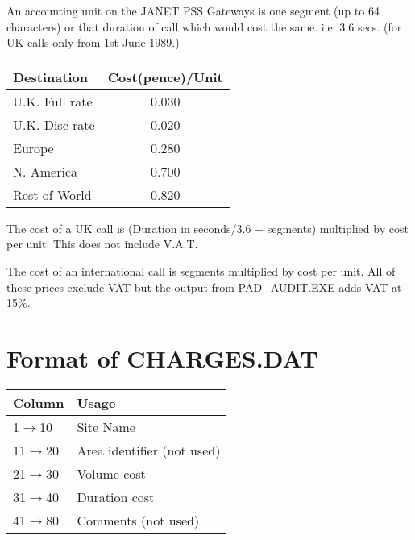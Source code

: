  An accounting unit on the JANET PSS Gateways is one segment (up  to  64
 characters) or  that  duration of call which would cost the same.  i.e.
 3.6 secs.  (for UK calls only from 1st June 1989.)
 
\begin{table}[h]
\begin{center}
\begin{tabular} {||l|c||}
\hline
Destination    & Cost(pence)/Unit \\
\hline
U.K. Full rate    &       0.030 \\
U.K. Disc rate    &       0.020 \\
Europe            &       0.280 \\
N. America        &       0.700 \\
Rest of World     &       0.820 \\
\hline
\end{tabular}
\end{center} 
\end{table}

The cost of a UK call is
(Duration in seconds/3.6 + segments) multiplied by cost per unit.  This
does not include V.A.T.
 
The cost of an international call is segments multiplied  by  cost  per
unit.
All of these prices  exclude VAT but the output from PAD\_\/AUDIT.EXE adds 
VAT at 15\%. 

\newpage

\section {Format of CHARGES.DAT }
\begin{table}[htb]
\begin{center}
\begin{tabular} {||l|l||}
\hline
Column   & Usage \\
\hline
 1$\rightarrow$10           &       Site Name                   \\
11$\rightarrow$20           &       Area identifier (not used)  \\
21$\rightarrow$30           &       Volume cost                 \\
31$\rightarrow$40           &       Duration cost               \\
41$\rightarrow$80           &       Comments (not used)         \\
\hline
\end{tabular}
\end{center} 
\end{table}

